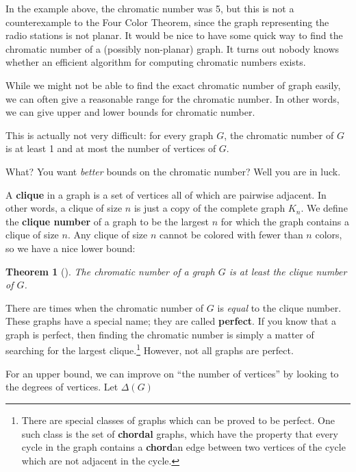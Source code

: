 \documentclass[10pt,]{book}
\newcommand{\terminology}[1]{\textbf{#1}}
\theoremstyle{plain}
\newtheorem{theorem}{Theorem}[section]
\theoremstyle{definition}
\theoremstyle{definition}
\theoremstyle{definition}
\theoremstyle{definition}
\numberwithin{equation}{chapter}
\begin{document}
\hypertarget{p-326}{}%
In the example above, the chromatic number was 5, but this is not a counterexample to the Four Color Theorem, since the graph representing the radio stations is not planar. It would be nice to have some quick way to find the chromatic number of a (possibly non-planar) graph. It turns out nobody knows whether an efficient algorithm for computing chromatic numbers exists.%
\par
\hypertarget{p-327}{}%
While we might not be able to find the exact chromatic number of graph easily, we can often give a reasonable range for the chromatic number. In other words, we can give upper and lower bounds for chromatic number.%
\par
\hypertarget{p-328}{}%
This is actually not very difficult: for every graph \(G\), the chromatic number of \(G\) is at least 1 and at most the number of vertices of \(G\).%
\par
\hypertarget{p-329}{}%
What? You want \emph{better} bounds on the chromatic number? Well you are in luck.%
\par
\hypertarget{p-330}{}%
A \terminology{clique} in a graph is a set of vertices all of which are pairwise adjacent. In other words, a clique of size \(n\) is just a copy of the complete graph \(K_n\). We define the \terminology{clique number} of a graph to be the largest \(n\) for which the graph contains a clique of size \(n\). Any clique of size \(n\) cannot be colored with fewer than \(n\) colors, so we have a nice lower bound:%
\begin{theorem}[{}]\label{theorem-7}
\hypertarget{p-331}{}%
The chromatic number of a graph \(G\) is at least the clique number of \(G\).%
\end{theorem}
\hypertarget{p-332}{}%
There are times when the chromatic number of \(G\) is \emph{equal} to the clique number. These graphs have a special name; they are called \terminology{perfect}. If you know that a graph is perfect, then finding the chromatic number is simply a matter of searching for the largest clique.\footnote{There are special classes of graphs which can be proved to be perfect.  One such class is the set of \terminology{chordal} graphs, which have the property that every cycle in the graph contains a \terminology{chord}\textemdash{}an edge between two vertices of the cycle which are not adjacent in the cycle.\label{fn-4}} However, not all graphs are perfect.%
\par
\hypertarget{p-333}{}%
For an upper bound, we can improve on ``the number of vertices'' by looking to the degrees of vertices. Let \(\Delta(G)\)\label{notation-7}
\end{document}

